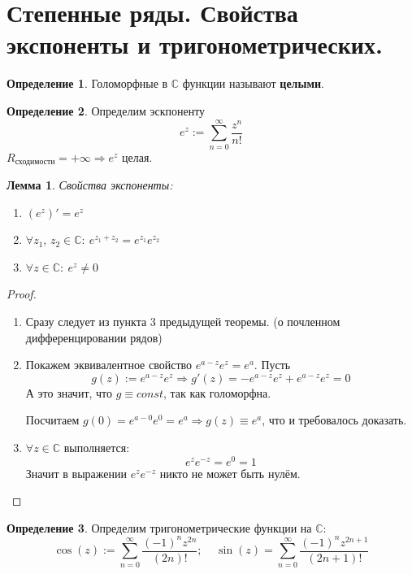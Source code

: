 \documentclass[a4paper,12pt]{article}
\theoremstyle{plain}
\newtheorem{lemma}{Лемма}[section]
\theoremstyle{definition}
\newtheorem{definition}{Определение}[section]
\theoremstyle{remark}
\begin{document}
\section{Степенные ряды. Свойства экспоненты и тригонометрических.}
\begin{definition}
	Голоморфные в $\mathbb{C}$ функции называют \textbf{целыми}.
\end{definition}

\begin{definition}
	Определим эскпоненту
	\[
		e^z := \sum_{n = 0}^\infty \frac{z^n}{n!}
	\]
	$R_\text{сходимости} = +\infty \Rightarrow e^z$ целая.
\end{definition}

\begin{lemma}
	Свойства экспоненты:
	\begin{enumerate}
		\item $(e^z)' = e^z$
		\item $\forall z_1,\,z_2 \in \mathbb{C} :\: e^{z_1 + z_2} = e^{z_1}e^{z_2}$
		\item $\forall z \in \mathbb{C} :\: e^z \neq 0$
	\end{enumerate}
\end{lemma}

\begin{proof}
	\begin{enumerate}
		\item Сразу следует из пункта 3 предыдущей теоремы. (о почленном дифференцировании рядов)
		\item Покажем эквивалентное свойство $e^{a - z}e^z = e^a$. Пусть
		      \[
			      g(z) := e^{a - z}e^z \Rightarrow g'(z) = -e^{a - z}e^z + e^{a - z}e^z = 0
		      \]
		      А это значит, что $g \equiv const$, так как голоморфна.

		      Посчитаем $g(0) = e^{a - 0}e^0 = e^a \Rightarrow g(z) \equiv e^a$, что и требовалось доказать.
		\item $\forall z \in \mathbb{C}$ выполняется:
		      \[
			      e^ze^{-z} = e^0 = 1
		      \]
		      Значит в выражении $e^ze^{-z}$ никто не может быть нулём.
	\end{enumerate}
\end{proof}

\begin{definition}
	Определим тригонометрические функции на $\mathbb{C}$:
	\[
		\cos(z) := \sum_{n = 0}^\infty \frac{(-1)^nz^{2n}}{(2n)!} ;\;\;\;\; \sin(z) = \sum_{n = 0}^\infty \frac{(-1)^nz^{2n + 1}}{(2n + 1)!}
	\]
\end{definition}
\end{document}
